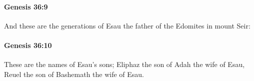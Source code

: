 		\paragraph{Genesis 36:9} %
			\label{GENESIS-36-9}

			And these are the generations of Esau the father of the Edomites in mount Seir:


		\paragraph{Genesis 36:10} %
			\label{GENESIS-36-10}

			These are the names of Esau's sons; Eliphaz the son of Adah the wife of Esau, Reuel the son of Bashemath the wife of Esau.


